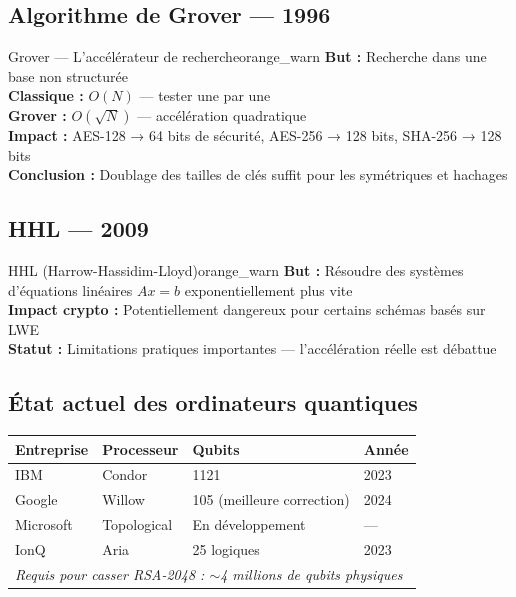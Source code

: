 \documentclass[12pt, a4paper]{article}
\begin{document}
\subsection{Algorithme de Grover --- 1996}

\begin{algobox}{Grover --- L'accélérateur de recherche}{orange_warn}
\textbf{But :} Recherche dans une base non structurée\\
\textbf{Classique :} $O(N)$ — tester une par une\\
\textbf{Grover :} $O(\sqrt{N})$ — accélération quadratique\\
\textbf{Impact :} AES-128 → 64 bits de sécurité, AES-256 → 128 bits, SHA-256 → 128 bits\\
\textbf{Conclusion :} Doublage des tailles de clés suffit pour les symétriques et hachages
\end{algobox}

\subsection{HHL --- 2009}

\begin{algobox}{HHL (Harrow-Hassidim-Lloyd)}{orange_warn}
\textbf{But :} Résoudre des systèmes d'équations linéaires $Ax = b$ exponentiellement plus vite\\
\textbf{Impact crypto :} Potentiellement dangereux pour certains schémas basés sur LWE\\
\textbf{Statut :} Limitations pratiques importantes --- l'accélération réelle est débattue
\end{algobox}

\subsection{État actuel des ordinateurs quantiques}

\begin{center}
\renewcommand{\arraystretch}{1.4}
\begin{tabular}{llll}
  \toprule
  \textbf{Entreprise} & \textbf{Processeur} & \textbf{Qubits} & \textbf{Année} \\
  \midrule
  IBM & Condor & 1121 & 2023 \\
  Google & Willow & 105 (meilleure correction) & 2024 \\
  Microsoft & Topological & En développement & --- \\
  IonQ & Aria & 25 logiques & 2023 \\
  \midrule
  \multicolumn{4}{l}{\textit{Requis pour casser RSA-2048 : $\sim$4 millions de qubits physiques}} \\
  \bottomrule
\end{tabular}
\end{center}
\end{document}
